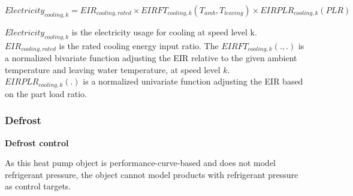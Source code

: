 \begin{equation}
Electricity_{cooling,k}=EIR_{cooling,rated} \times EIRFT_{cooling,k}(T_{amb}, T_{leaving}) \times EIRPLR_{cooling,k}(PLR)       
\end{equation}

$Electricity_{cooling,k}$ is the electricity usage for cooling at speed level k.
$EIR_{cooling,rated}$ is the rated cooling energy input ratio. The $EIRFT_{cooling,k}(., .)$ is a
normalized bivariate function adjusting the EIR relative to the given ambient temperature
and leaving water temperature, at speed level $k$.
$EIRPLR_{cooling,k}(.)$ is a normalized univariate function adjusting the EIR based
on the part load ratio.

\subsubsection{Defrost}

\noindent\textbf{Defrost control}

As this heat pump object is performance-curve-based and does not model
refrigerant pressure, the object cannot model products with refrigerant pressure
as control targets.

